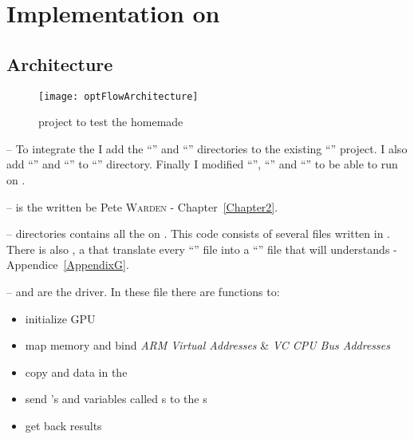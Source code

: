 
\section{Implementation on \vc}

\subsection{Architecture}

\begin{figure}[!htbp]
	\centering
	\texttt{[image: optFlowArchitecture]}
\caption{ project to test the homemade \api}
	\label{optFlowFig}
\end{figure}
\FloatBarrier

-- To integrate the \api{} I add the \enquote{} and \enquote{} directories to the existing \enquote{} project. I also add \enquote{} and \enquote{} to \enquote{} directory. Finally I modified \enquote{}, \enquote{} and \enquote{} to be able to run \flow{}  on \vc.

--  is the  written be Pete \textsc{Warden} - Chapter~\ref{Chapter2}.

--  directories contains all the  on \vc. This code consists of several  files written in .\\
There is also , a  that translate every \enquote{} file into a \enquote{} file that \vc{} will understands - Appendice~\ref{AppendixG}.

--  and  are the  driver. In these file there are functions to:
\begin{itemize}
	\item initialize GPU
	\item map \ram{} memory and bind \emph{ARM Virtual Addresses} \& \emph{VC CPU Bus Addresses}
	\item copy  and data in the \ram
	\item send 's  and variables called \uni{}s to the \qpu{}s
	\item get back results
\end{itemize}


